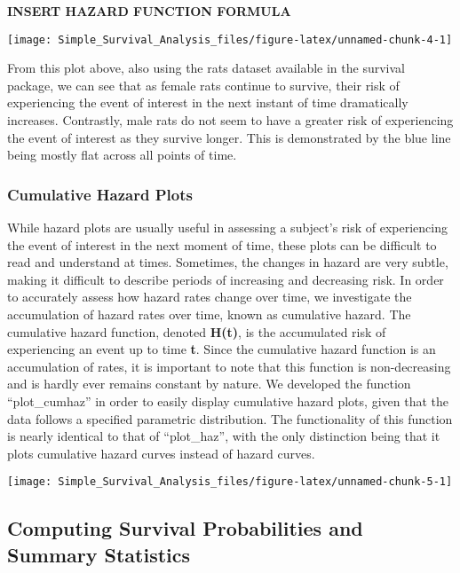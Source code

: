 \textbf{INSERT HAZARD FUNCTION FORMULA}

\begin{Schunk}

\texttt{[image: Simple\_Survival\_Analysis\_files/figure-latex/unnamed-chunk-4-1]} \end{Schunk}

From this plot above, also using the rats dataset available in the
survival package, we can see that as female rats continue to survive,
their risk of experiencing the event of interest in the next instant of
time dramatically increases. Contrastly, male rats do not seem to have a
greater risk of experiencing the event of interest as they survive
longer. This is demonstrated by the blue line being mostly flat across
all points of time.

\hypertarget{cumulative-hazard-plots}{%
\subsubsection{Cumulative Hazard Plots}\label{cumulative-hazard-plots}}

While hazard plots are usually useful in assessing a subject's risk of
experiencing the event of interest in the next moment of time, these
plots can be difficult to read and understand at times. Sometimes, the
changes in hazard are very subtle, making it difficult to describe
periods of increasing and decreasing risk. In order to accurately assess
how hazard rates change over time, we investigate the accumulation of
hazard rates over time, known as cumulative hazard. The cumulative
hazard function, denoted \textbf{H(t)}, is the accumulated risk of
experiencing an event up to time \textbf{t}. Since the cumulative hazard
function is an accumulation of rates, it is important to note that this
function is non-decreasing and is hardly ever remains constant by
nature. We developed the function ``plot\_cumhaz'' in order to easily
display cumulative hazard plots, given that the data follows a specified
parametric distribution. The functionality of this function is nearly
identical to that of ``plot\_haz'', with the only distinction being that
it plots cumulative hazard curves instead of hazard curves.

\begin{Schunk}

\texttt{[image: Simple\_Survival\_Analysis\_files/figure-latex/unnamed-chunk-5-1]} \end{Schunk}

\hypertarget{computing-survival-probabilities-and-summary-statistics}{%
\subsection{Computing Survival Probabilities and Summary
Statistics}\label{computing-survival-probabilities-and-summary-statistics}}

